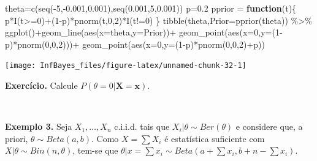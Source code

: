 \documentclass[
]{book}
\newenvironment{Shaded}{\begin{snugshade}}{\end{snugshade}}
\newcommand{\AttributeTok}[1]{\textcolor[rgb]{0.77,0.63,0.00}{#1}}
\newcommand{\ControlFlowTok}[1]{\textcolor[rgb]{0.13,0.29,0.53}{\textbf{#1}}}
\newcommand{\DecValTok}[1]{\textcolor[rgb]{0.00,0.00,0.81}{#1}}
\newcommand{\FloatTok}[1]{\textcolor[rgb]{0.00,0.00,0.81}{#1}}
\newcommand{\FunctionTok}[1]{\textcolor[rgb]{0.00,0.00,0.00}{#1}}
\newcommand{\NormalTok}[1]{#1}
\newcommand{\OtherTok}[1]{\textcolor[rgb]{0.56,0.35,0.01}{#1}}
\newcommand{\SpecialCharTok}[1]{\textcolor[rgb]{0.00,0.00,0.00}{#1}}
\begin{document}
\begin{Shaded}
\begin{Highlighting}[]
\NormalTok{theta}\OtherTok{=}\FunctionTok{c}\NormalTok{(}\FunctionTok{seq}\NormalTok{(}\SpecialCharTok{{-}}\DecValTok{5}\NormalTok{,}\SpecialCharTok{{-}}\FloatTok{0.001}\NormalTok{,}\FloatTok{0.001}\NormalTok{),}\FunctionTok{seq}\NormalTok{(}\FloatTok{0.001}\NormalTok{,}\DecValTok{5}\NormalTok{,}\FloatTok{0.001}\NormalTok{))}
\NormalTok{p}\OtherTok{=}\FloatTok{0.2}
\NormalTok{pprior }\OtherTok{=} \ControlFlowTok{function}\NormalTok{(t)\{}
\NormalTok{  p}\SpecialCharTok{*}\FunctionTok{I}\NormalTok{(t}\SpecialCharTok{\textgreater{}=}\DecValTok{0}\NormalTok{)}\SpecialCharTok{+}\NormalTok{(}\DecValTok{1}\SpecialCharTok{{-}}\NormalTok{p)}\SpecialCharTok{*}\FunctionTok{pnorm}\NormalTok{(t,}\DecValTok{0}\NormalTok{,}\DecValTok{2}\NormalTok{)}\SpecialCharTok{*}\FunctionTok{I}\NormalTok{(t}\SpecialCharTok{!=}\DecValTok{0}\NormalTok{)}
\NormalTok{\}}
\FunctionTok{tibble}\NormalTok{(theta,}\AttributeTok{Prior=}\FunctionTok{pprior}\NormalTok{(theta)) }\SpecialCharTok{\%\textgreater{}\%}
  \FunctionTok{ggplot}\NormalTok{()}\SpecialCharTok{+}\FunctionTok{geom\_line}\NormalTok{(}\FunctionTok{aes}\NormalTok{(}\AttributeTok{x=}\NormalTok{theta,}\AttributeTok{y=}\NormalTok{Prior))}\SpecialCharTok{+}
    \FunctionTok{geom\_point}\NormalTok{(}\FunctionTok{aes}\NormalTok{(}\AttributeTok{x=}\DecValTok{0}\NormalTok{,}\AttributeTok{y=}\NormalTok{(}\DecValTok{1}\SpecialCharTok{{-}}\NormalTok{p)}\SpecialCharTok{*}\FunctionTok{pnorm}\NormalTok{(}\DecValTok{0}\NormalTok{,}\DecValTok{0}\NormalTok{,}\DecValTok{2}\NormalTok{)))}\SpecialCharTok{+}
    \FunctionTok{geom\_point}\NormalTok{(}\FunctionTok{aes}\NormalTok{(}\AttributeTok{x=}\DecValTok{0}\NormalTok{,}\AttributeTok{y=}\NormalTok{(}\DecValTok{1}\SpecialCharTok{{-}}\NormalTok{p)}\SpecialCharTok{*}\FunctionTok{pnorm}\NormalTok{(}\DecValTok{0}\NormalTok{,}\DecValTok{0}\NormalTok{,}\DecValTok{2}\NormalTok{)}\SpecialCharTok{+}\NormalTok{p))}
\end{Highlighting}
\end{Shaded}

\begin{center}\texttt{[image: InfBayes\_files/figure-latex/unnamed-chunk-32-1]} \end{center}

\textbf{Exercício.} Calcule \(P(\theta=0|\boldsymbol X=\boldsymbol x)\).

\(~\)

\textbf{Exemplo 3.} Seja \(X_1,\ldots,X_n\) c.i.i.d. tais que \(X_i|\theta \sim Ber (\theta)\) e considere que, a priori, \(\theta\sim Beta(a,b)\). Como \(X=\sum X_i\) é estatística suficiente com \(X\big|\theta \sim Bin(n,\theta)\), tem-se que \(\theta\big|x=\sum x_i\sim Beta\left(a+\sum x_i,b+n-\sum x_i\right)\).
\end{document}
